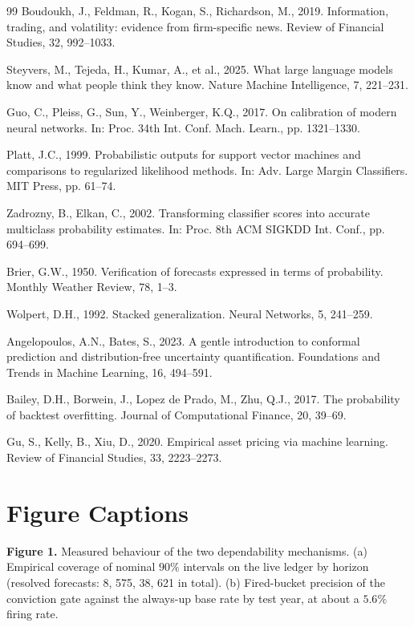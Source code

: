 \documentclass[12pt,a4paper]{article}
\begin{document}
\begin{singlespace}
\begin{thebibliography}{99}
Boudoukh, J., Feldman, R., Kogan, S., Richardson, M., 2019. Information, trading,
and volatility: evidence from firm-specific news. Review of Financial Studies, 32,
992--1033.

Steyvers, M., Tejeda, H., Kumar, A., et al., 2025. What large language models know
and what people think they know. Nature Machine Intelligence, 7, 221--231.

Guo, C., Pleiss, G., Sun, Y., Weinberger, K.Q., 2017. On calibration of modern
neural networks. In: Proc. 34th Int. Conf. Mach. Learn., pp. 1321--1330.

Platt, J.C., 1999. Probabilistic outputs for support vector machines and comparisons
to regularized likelihood methods. In: Adv. Large Margin Classifiers. MIT Press, pp. 61--74.

Zadrozny, B., Elkan, C., 2002. Transforming classifier scores into accurate
multiclass probability estimates. In: Proc. 8th ACM SIGKDD Int. Conf., pp. 694--699.

Brier, G.W., 1950. Verification of forecasts expressed in terms of probability.
Monthly Weather Review, 78, 1--3.

Wolpert, D.H., 1992. Stacked generalization. Neural Networks, 5, 241--259.

Angelopoulos, A.N., Bates, S., 2023. A gentle introduction to conformal prediction
and distribution-free uncertainty quantification. Foundations and Trends in Machine
Learning, 16, 494--591.

Bailey, D.H., Borwein, J., Lopez de Prado, M., Zhu, Q.J., 2017. The probability of
backtest overfitting. Journal of Computational Finance, 20, 39--69.

Gu, S., Kelly, B., Xiu, D., 2020. Empirical asset pricing via machine learning.
Review of Financial Studies, 33, 2223--2273.

\end{thebibliography}
\end{singlespace}

\clearpage
\section*{Figure Captions}
\begin{singlespace}
\noindent\textbf{Figure 1.} Measured behaviour of the two dependability mechanisms.
(a) Empirical coverage of nominal $90\%$ intervals on the live ledger by horizon
(resolved forecasts: 8, 575, 38, 621 in total). (b) Fired-bucket precision of the
conviction gate against the always-up base rate by test year, at about a $5.6\%$
firing rate.
\end{singlespace}
\end{document}
